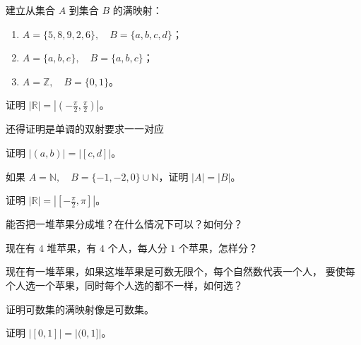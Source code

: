 \begin{homework}[1.2]
建立从集合 $A$ 到集合 $B$ 的满映射：
\begin{enumerate}
  \item $A = \{5,8,9,2,6\}, \quad B = \{a,b,c,d\}$；
  \item $A = \{a,b,e\}, \quad B = \{a,b,c\}$；
  \item $A = \mathbb{Z}, \quad B = \{0,1\}$。
\end{enumerate}
\end{homework}

\begin{homework}[1.3]
证明 $|\mathbb{R}| = |(-\tfrac{\pi}{2}, \tfrac{\pi}{2})|$。
\end{homework}

\begin{dxtips}
    还得证明是单调的双射要求一一对应
\end{dxtips}

\begin{homework}[1.4]
证明 $|(a,b)| = |[c,d]|$。
\end{homework}

\begin{homework}[1.5]
如果 $A = \mathbb{N}, \quad B = \{-1,-2,0\} \cup \mathbb{N}$，证明 $|A| = |B|$。
\end{homework}

\begin{homework}[1.6]
证明 $|\mathbb{R}| = |[-\tfrac{\pi}{2}, \pi]|$。
\end{homework}

\begin{homework}[1.7]
能否把一堆苹果分成堆？在什么情况下可以？如何分？
\end{homework}

\begin{homework}[1.8]
现在有 $4$ 堆苹果，有 $4$ 个人，每人分 $1$ 个苹果，怎样分？
\end{homework}

\begin{homework}[1.9]
现在有一堆苹果，如果这堆苹果是可数无限个，每个自然数代表一个人，
要使每个人选一个苹果，同时每个人选的都不一样，如何选？
\end{homework}

\begin{homework}[1.10]
证明可数集的满映射像是可数集。
\end{homework}

\begin{homework}[1.11]
证明 $|[0,1]| = |(0,1]|$。
\end{homework}

